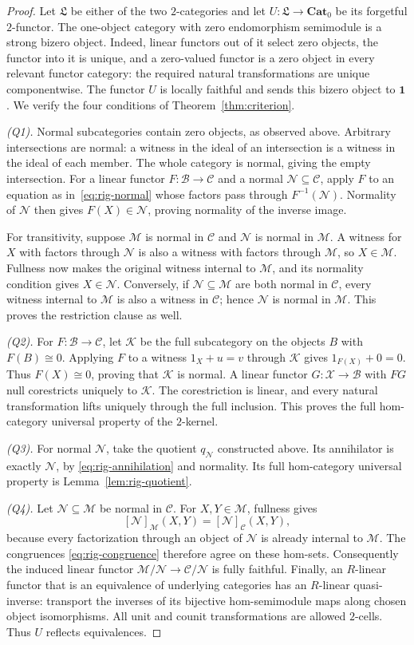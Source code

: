 \documentclass[11pt,reqno,a4paper]{amsart}
\theoremstyle{definition}
\theoremstyle{remark}
\newcommand{\C}{\mathcal{C}}
\newcommand{\M}{\mathcal{M}}
\newcommand{\N}{\mathcal{N}}
\newcommand{\0}{\mathbf{0}}
\renewcommand{\1}{\mathbf{1}}
\newcommand{\iso}{\cong}
\newcommand{\Pt}{\mathbf{Cat}_{0}}
\newcommand{\Lcat}{\mathfrak L}
\newcommand{\B}{\mathcal B}
\newcommand{\K}{\mathcal K}
\newcommand{\X}{\mathcal X}
\begin{document}
\begin{proof}
Let $\Lcat$ be either of the two $2$-categories and let
$U:\Lcat\to\Pt$ be its forgetful $2$-functor. The one-object
category with zero endomorphism semimodule is a strong bizero
object. Indeed, linear functors out of it select zero objects,
the functor into it is unique, and a zero-valued functor is a
zero object in every relevant functor category: the required
natural transformations are unique componentwise. The functor
$U$ is locally faithful and sends this bizero object to
$\mathbf1$. We verify the four conditions of
Theorem~\ref{thm:criterion}.

\smallskip\noindent\emph{(Q1).}
Normal subcategories contain zero objects, as observed above.
Arbitrary intersections are normal: a witness in the ideal of
an intersection is a witness in the ideal of each member.
The whole category is normal, giving the empty intersection.
For a linear functor $F:\B\to\C$ and a normal
$\N\subseteq\C$, apply $F$ to an equation as
in~\eqref{eq:rig-normal} whose factors pass through
$F^{-1}(\N)$. Normality of $\N$ then gives
$F(X)\in\N$, proving normality of the inverse image.

For transitivity, suppose $\M$ is normal in $\C$ and $\N$
is normal in $\M$. A witness for $X$ with factors through
$\N$ is also a witness with factors through $\M$, so
$X\in\M$. Fullness now makes the original witness internal
to $\M$, and its normality condition gives $X\in\N$.
Conversely, if $\N\subseteq\M$ are both normal in $\C$,
every witness internal to $\M$ is also a witness in $\C$;
hence $\N$ is normal in $\M$. This proves the restriction
clause as well.

\smallskip\noindent\emph{(Q2).}
For $F:\B\to\C$, let $\K$ be the full subcategory on
the objects $B$ with $F(B)\iso0$. Applying $F$ to a witness
$1_X+u=v$ through $\K$ gives $1_{F(X)}+0=0$.
Thus $F(X)\iso0$, proving that $\K$ is normal.
A linear functor $G:\X\to\B$ with $FG$ null corestricts
uniquely to $\K$. The corestriction is linear, and every
natural transformation lifts uniquely through the full
inclusion. This proves the full hom-category universal
property of the $2$-kernel.

\smallskip\noindent\emph{(Q3).}
For normal $\N$, take the quotient $q_{\N}$ constructed
above. Its annihilator is exactly $\N$, by
\eqref{eq:rig-annihilation} and normality. Its full
hom-category universal property is
Lemma~\ref{lem:rig-quotient}.

\smallskip\noindent\emph{(Q4).}
Let $\N\subseteq\M$ be normal in $\C$. For $X,Y\in\M$,
fullness gives
\begin{equation}\label{eq:rig-restriction}
 [\N]_{\M}(X,Y)=[\N]_{\C}(X,Y),
\end{equation}
because every factorization through an object of $\N$ is
already internal to $\M$. The congruences
\eqref{eq:rig-congruence} therefore agree on these hom-sets.
Consequently the induced linear functor
$\M/\N\to\C/\N$ is fully faithful.
Finally, an $R$-linear functor that is an equivalence of
underlying categories has an $R$-linear quasi-inverse:
transport the inverses of its bijective hom-semimodule maps
along chosen object isomorphisms. All unit and counit
transformations are allowed $2$-cells. Thus $U$ reflects
equivalences.


\end{proof}
\end{document}
